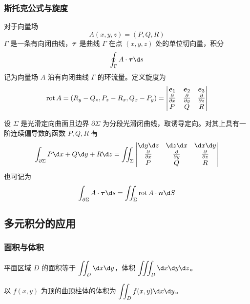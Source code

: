 \subsubsection*{斯托克公式与旋度}

对于向量场
\[ A(x, y, z) = (P, Q, R) \]
$\Gamma$ 是一条有向闭曲线，$\boldsymbol{\tau}$ 是曲线 $\Gamma$ 在点 $(x, y, z)$ 处的单位切向量，积分
\[ \oint_{\Gamma} A \cdot \vbf{\tau} \d s  \]
记为向量场 $A$ 沿有向闭曲线 $\Gamma$ 的环流量。定义旋度为
\[ \operatorname{rot} A = \left(R_y - Q_z, P_z - R_x, Q_x - P_y \right) = \left| \begin{matrix}
		\boldsymbol{e}_1                   & \boldsymbol{e}_2                   & \boldsymbol{e}_3                   \\
		\frac{\partial}{\partial x} & \frac{\partial}{\partial y} & \frac{\partial}{\partial z} \\
		P                           & Q                           & R
	\end{matrix} \right| \]

\begin{theorem}[Stokes 公式]
	设 $\Sigma$ 是光滑定向曲面且边界 $\partial \Sigma$ 为分段光滑闭曲线，取诱导定向。对其上具有一阶连续偏导数的函数 $P, Q, R$ 有
	\[ \int_{\partial \Sigma} P \d x + Q \d y + R \d z = \iint_\Sigma \left| \begin{matrix}
			\d y \d z                   & \d z \d x                   & \d x \d y                   \\
			\frac{\partial}{\partial x} & \frac{\partial}{\partial y} & \frac{\partial}{\partial z} \\
			P                           & Q                           & R
		\end{matrix} \right| \]
	也可记为
	\[ \int_{\partial \Sigma} A \cdot \vbf{\tau} \d s = \iint_\Sigma \operatorname{rot} A \cdot \vbf{n} \d S \]
\end{theorem}

\subsection{多元积分的应用}

\subsubsection*{面积与体积}

平面区域 $D$ 的面积等于 $\displaystyle \iint_D \d x \d y$，体积 $\displaystyle \iiint_D \d x \d y \d z$。

以 $f(x,y)$ 为顶的曲顶柱体的体积为 $\displaystyle \iint_D f(x, y)\d x \d y$。

